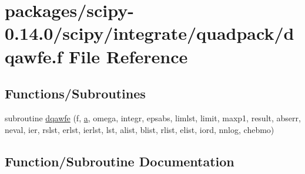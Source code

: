 \hypertarget{dqawfe_8f}{}\section{packages/scipy-\/0.14.0/scipy/integrate/quadpack/dqawfe.f File Reference}
\label{dqawfe_8f}
\subsection*{Functions/\+Subroutines}
\begin{DoxyCompactItemize}
\item 
subroutine \hyperlink{dqawfe_8f_a8c991ec87bb2062a57a3ed106c26c19e}{dqawfe} (f, \hyperlink{gen__mat5files_8m_aae328bf20413f220e38aec4d95bfd6da}{a}, omega, integr, epsabs, limlst, limit, maxp1, result, abserr, neval, ier, rslst, erlst, ierlst, lst, alist, blist, rlist, elist, iord, nnlog, chebmo)
\end{DoxyCompactItemize}


\subsection{Function/\+Subroutine Documentation}
\hypertarget{dqawfe_8f_a8c991ec87bb2062a57a3ed106c26c19e}{}
